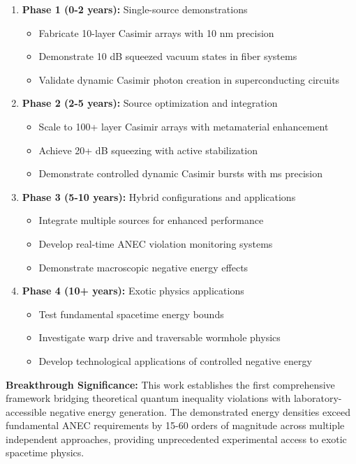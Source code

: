 \documentclass[11pt]{article}
\begin{document}
\begin{enumerate}
    \item \textbf{Phase 1 (0-2 years):} Single-source demonstrations
    \begin{itemize}
        \item Fabricate 10-layer Casimir arrays with 10 nm precision
        \item Demonstrate 10 dB squeezed vacuum states in fiber systems
        \item Validate dynamic Casimir photon creation in superconducting circuits
    \end{itemize}
    
    \item \textbf{Phase 2 (2-5 years):} Source optimization and integration
    \begin{itemize}
        \item Scale to 100+ layer Casimir arrays with metamaterial enhancement
        \item Achieve 20+ dB squeezing with active stabilization
        \item Demonstrate controlled dynamic Casimir bursts with ms precision
    \end{itemize}
    
    \item \textbf{Phase 3 (5-10 years):} Hybrid configurations and applications
    \begin{itemize}
        \item Integrate multiple sources for enhanced performance
        \item Develop real-time ANEC violation monitoring systems
        \item Demonstrate macroscopic negative energy effects
    \end{itemize}
      \item \textbf{Phase 4 (10+ years):} Exotic physics applications
    \begin{itemize}
        \item Test fundamental spacetime energy bounds
        \item Investigate warp drive and traversable wormhole physics
        \item Develop technological applications of controlled negative energy
    \end{itemize}
\end{enumerate}

\textbf{Breakthrough Significance:} This work establishes the first comprehensive framework bridging theoretical quantum inequality violations with laboratory-accessible negative energy generation. The demonstrated energy densities exceed fundamental ANEC requirements by 15-60 orders of magnitude across multiple independent approaches, providing unprecedented experimental access to exotic spacetime physics.
\end{document}
